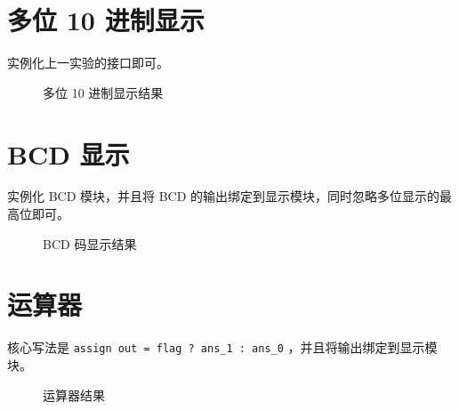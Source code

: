 \documentclass[lang=cn,11pt,a4paper,cite=authoryear]{elegantpaper}
\begin{document}
\section{多位 10 进制显示}

实例化上一实验的接口即可。


\begin{figure}
    \centering
    \caption{多位 10 进制显示结果}\label{06} 
    \bigskip
\end{figure}

\section{BCD 显示}

实例化 BCD 模块，并且将 BCD 的输出绑定到显示模块，同时忽略多位显示的最高位即可。

\begin{figure}
    \centering
    \caption{BCD 码显示结果}\label{03} 
     \hfill 
     \hfill 
\end{figure}

\section{运算器}

核心写法是 \lstinline{assign out = flag ? ans_1 : ans_0} ，并且将输出绑定到显示模块。

\begin{figure}
    \centering
    \caption{运算器结果}\label{05} 
    \bigskip
    \bigskip
\end{figure}

\end{document}
